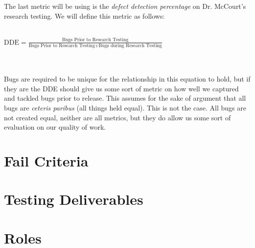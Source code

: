\documentclass[english,12pt]{article}
\begin{document}
The last metric will be using is the \textit{defect detection percentage} on Dr. McCourt's 
research testing. We will define this metric as follows:\\\\
\centerline{$\text{DDE} = \frac{\text{Bugs Prior to Research Testing}}{\text{Bugs Prior to Research Testing} + \text{Bugs during Research Testing}}$}
\\\\
Bugs are required to be unique for the relationship in this equation to hold, but if they are the DDE should 
give us some sort of metric on how well we captured and tackled bugs prior to release. This 
assumes for the sake of argument that all bugs are \textit{ceteris paribus} (all things held equal).
This is not the case. All bugs are not created equal, neither are all metrics, but they do 
allow us some sort of evaluation on our quality of work.
\section{Fail Criteria}

\section{Testing Deliverables}

\section{Roles}
\end{document}
